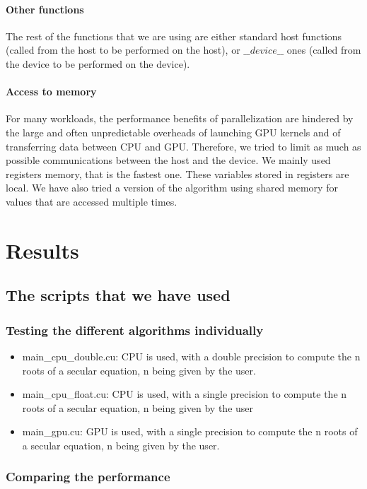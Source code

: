 \documentclass[10pt,a4paper]{article}
\begin{document}
\paragraph{Other functions} The rest of the functions that we are using are either standard host functions (called from the host to be performed on the host), or $\_\_device\_\_$ ones (called from the device to be performed on the device). 

\paragraph{Access to memory} For many workloads, the performance benefits of parallelization are hindered by the large and often unpredictable overheads of launching GPU kernels and of transferring data between CPU and GPU. Therefore, we tried to limit as much as possible communications between the host and the device. We mainly used registers memory, that is the fastest one. These variables stored in registers are local. We have also tried a version of the algorithm using shared memory for values that are accessed multiple times.

\section{Results}

\subsection{The scripts that we have used}
\subsubsection{Testing the different algorithms individually}
\begin{itemize}
    \item main\_cpu\_double.cu: CPU is used, with a double precision to compute the n roots of a secular equation, n being given by the user.
    \item main\_cpu\_float.cu: CPU is used, with a single precision to compute the n roots of a secular equation, n being given by the user
    \item main\_gpu.cu: GPU is used, with a single precision to compute the n roots of a secular equation, n being given by the user.
\end{itemize}

\subsubsection{Comparing the performance}
\end{document}
